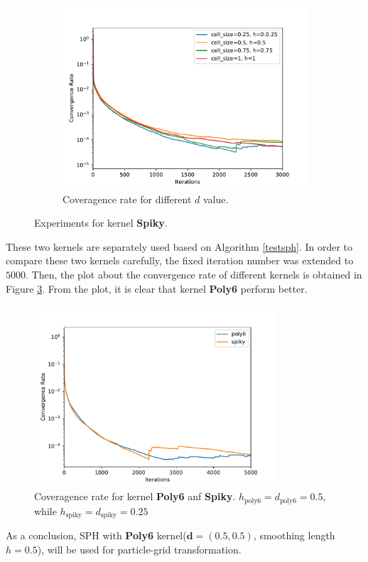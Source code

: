 \begin{figure}[!ht]
\begin{subfigure}[b]{0.7\textwidth}
            \includegraphics[width=\textwidth]{Figures/spikysize.pdf}
            \caption{Coveragence rate for different $d$ value.}
            \label{fig:spikyttime}
        \end{subfigure}
        \caption{Experiments for kernel \textbf{Spiky}.}
        \label{spiky}
    \end{figure}
    These two kernels are separately used based on Algorithm \ref{testsph}. In order to compare these two kernels carefully, the fixed iteration number was extended to $5000$. Then, the plot about the convergence rate of different kernels is obtained in Figure \ref{fig:testdkernel}. From the plot, it is clear that kernel \textbf{Poly6} perform better.  
    \begin{figure}[!ht]{}
        \centering
        \includegraphics[width=0.8\textwidth]{Figures/kerneltest.pdf}
        \caption{Coveragence rate for kernel \textbf{Poly6} anf \textbf{Spiky}. $h_\text{poly6} = d_\text{poly6} = 0.5$, while $h_\text{spiky} = d_\text{spiky} = 0.25$}
        \label{fig:testdkernel}
    \end{figure}
    As a conclusion, SPH with \textbf{Poly6} kernel($\pmb{d} = (0.5, 0.5)$, smoothing length $h=0.5$), will be used for particle-grid transformation. \\

